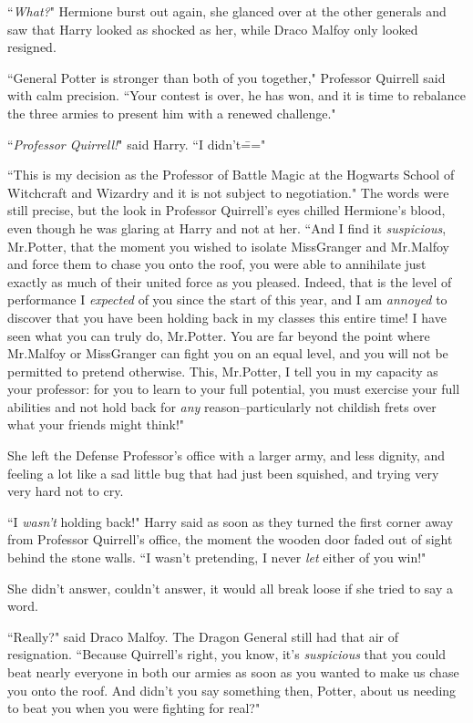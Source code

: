 ``\emph{What?}" Hermione burst out again, she glanced over at the other generals and saw that Harry looked as shocked as her, while Draco Malfoy only looked resigned.

``General Potter is stronger than both of you together," Professor Quirrell said with calm precision. ``Your contest is over, he has won, and it is time to rebalance the three armies to present him with a renewed challenge."

``\emph{Professor Quirrell!}" said Harry. ``I didn't\==="

``This is my decision as the Professor of Battle Magic at the Hogwarts School of Witchcraft and Wizardry and it is not subject to negotiation." The words were still precise, but the look in Professor Quirrell's eyes chilled Hermione's blood, even though he was glaring at Harry and not at her. ``And I find it \emph{suspicious}, Mr.\?Potter, that the moment you wished to isolate Miss\?Granger and Mr.\?Malfoy and force them to chase you onto the roof, you were able to annihilate just exactly as much of their united force as you pleased. Indeed, that is the level of performance I \emph{expected} of you since the start of this year, and I am \emph{annoyed} to discover that you have been holding back in my classes this entire time! I have seen what you can truly do, Mr.\?Potter. You are far beyond the point where Mr.\?Malfoy or Miss\?Granger can fight you on an equal level, and you will not be permitted to pretend otherwise. This, Mr.\?Potter, I tell you in my capacity as your professor: for you to learn to your full potential, you must exercise your full abilities and not hold back for \emph{any} reason\---particularly not childish frets over what your friends might think!"

\later

She left the Defense Professor's office with a larger army, and less dignity, and feeling a lot like a sad little bug that had just been squished, and trying very very hard not to cry.

``I \emph{wasn't} holding back!" Harry said as soon as they turned the first corner away from Professor Quirrell's office, the moment the wooden door faded out of sight behind the stone walls. ``I wasn't pretending, I never \emph{let} either of you win!"

She didn't answer, couldn't answer, it would all break loose if she tried to say a word.

``Really?" said Draco Malfoy. The Dragon General still had that air of resignation. ``Because Quirrell's right, you know, it's \emph{suspicious} that you could beat nearly everyone in both our armies as soon as you wanted to make us chase you onto the roof. And didn't you say something then, Potter, about us needing to beat you when you were fighting for real?"

